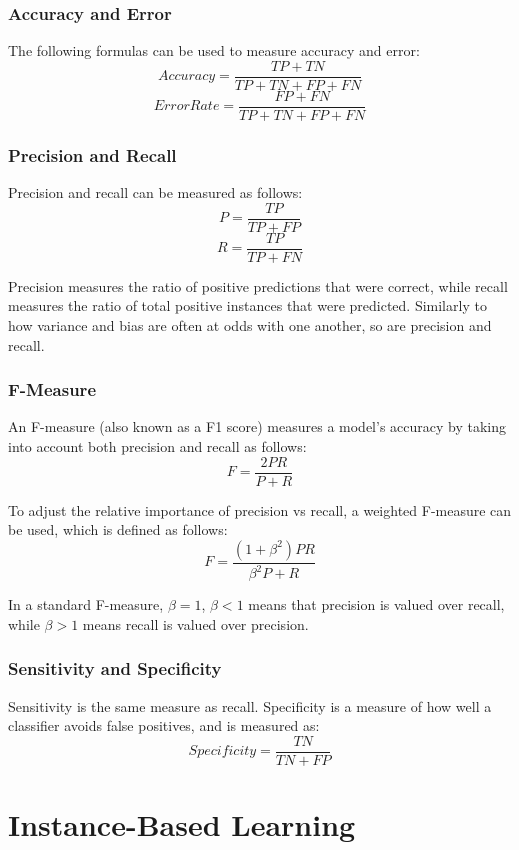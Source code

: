 \documentclass[12pt,titlepage]{article}
\let\stdsection\section
\renewcommand\section{\clearpage\stdsection}
\begin{document}
      \subsubsection{Accuracy and Error}
        The following formulas can be used to measure accuracy and error:
        $$Accuracy = \frac{TP + TN}{TP + TN + FP + FN}$$
        $$ErrorRate = \frac{FP + FN}{TP + TN + FP + FN}$$

      \subsubsection{Precision and Recall}
        Precision and recall can be measured as follows:
        $$P = \frac{TP}{TP + FP}$$
        $$R = \frac{TP}{TP + FN}$$

        Precision measures the ratio of positive predictions that were correct, while recall measures the ratio of total positive instances that were
        predicted. Similarly to how variance and bias are often at odds with one another, so are precision and recall.

      \subsubsection{F-Measure}
        An F-measure (also known as a F1 score) measures a model's accuracy by taking into account both precision and recall as follows:
        $$F = \frac{2PR}{P + R}$$

        To adjust the relative importance of precision vs recall, a weighted F-measure can be used, which is defined as follows:
        $$F = \frac{(1 + \beta^2)PR}{\beta^2 P + R}$$

        In a standard F-measure, $\beta = 1$, $\beta < 1$ means that precision is valued over recall, while $\beta > 1$ means recall is valued over precision.

      \subsubsection{Sensitivity and Specificity}
        Sensitivity is the same measure as recall. Specificity is a measure of how well a classifier avoids false positives, and is measured as:
        $$Specificity = \frac{TN}{TN + FP}$$

  \section{Instance-Based Learning}
\end{document}
